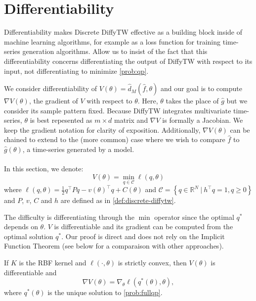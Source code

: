 \section{Differentiability}
Differentiability makes Discrete DiffyTW effective as a building block inside of machine learning algorithms, for example as a loss function for training time-series generation algorithms. Allow us to insist of the fact that this differentiability concerns differentiating the output of DiffyTW with respect to its input, not differentiating to minimize \cref{prob:qp}.

We consider differentiability of $V(\theta) = \hat d_M(\hat f, \theta)$ and our goal is to compute $\nabla V(\theta)$, the gradient of $V$ with respect to $\theta$. Here, $\theta$ takes the place of $\hat g$ but we consider its sample pattern fixed. Because DiffyTW integrates multivariate time-series, $\theta$ is best repesented as $m \times d$ matrix and $\nabla V$ is formally a Jacobian. We keep the gradient notation for clarity of exposition. Additionally, $\nabla V(\theta)$ can be chained to extend to the (more common) case where we wish to compare $\hat f$ to $\hat g(\theta)$, a time-series generated by a model.

\paragraph{}
In this section, we denote:
\begin{equation}\label{prob:fullqp}
    V(\theta) = \min_{q\in\mathcal C} \ell(q, \theta)
\end{equation}
where $\ell(q, \theta) = \frac{1}{2} q^\top Pq - v(\theta)^\top q + C(\theta)$ and $\mathcal C = \left\lbrace q\in\mathbb R^N ~\vert~ h^\top q=1, q \geq 0\right\rbrace$ and $P$, $v$, $C$ and $h$ are defined as in \cref{def:discrete-diffytw}.

The difficulty is differentiating through the $\min$ operator since the optimal $q^*$ depends on $\theta$. $V$ is differentiable and its gradient can be computed from the optimal solution $q^*$. Our proof is direct and does not rely on the Implicit Function Theorem (see below for a comparaison with other approaches).

\begin{theorem}\label{thm:diffytw-grad}
    If $K$ is the RBF kernel and $\ell(\cdot, \theta)$ is strictly convex, then $V(\theta)$ is differentiable and
    \begin{equation}
         \nabla V(\theta) = \nabla_\theta \ell(q^*(\theta), \theta),
    \end{equation} where $q^*(\theta)$ is the unique solution to \cref{prob:fullqp}.
\end{theorem}

